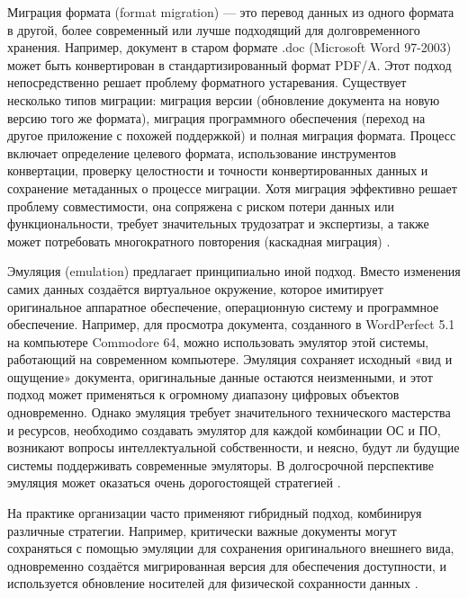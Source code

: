 \documentclass{SibFU-docs}
\begin{document}
Миграция формата (format migration) — это перевод данных из одного формата в другой, более современный или лучше подходящий для долговременного хранения. Например, документ в старом формате .doc (Microsoft Word 97-2003) может быть конвертирован в стандартизированный формат PDF/A. Этот подход непосредственно решает проблему форматного устаревания. Существует несколько типов миграции: миграция версии (обновление документа на новую версию того же формата), миграция программного обеспечения (переход на другое приложение с похожей поддержкой) и полная миграция формата. Процесс включает определение целевого формата, использование инструментов конвертации, проверку целостности и точности конвертированных данных и сохранение метаданных о процессе миграции. Хотя миграция эффективно решает проблему совместимости, она сопряжена с риском потери данных или функциональности, требует значительных трудозатрат и экспертизы, а также может потребовать многократного повторения (каскадная миграция) \cite{SmithsonianInstitution2017PreservationFormats, Cornell2025ArchivingFileFormats}.

Эмуляция (emulation) предлагает принципиально иной подход. Вместо изменения самих данных создаётся виртуальное окружение, которое имитирует оригинальное аппаратное обеспечение, операционную систему и программное обеспечение. Например, для просмотра документа, созданного в WordPerfect 5.1 на компьютере Commodore 64, можно использовать эмулятор этой системы, работающий на современном компьютере. Эмуляция сохраняет исходный «вид и ощущение» документа, оригинальные данные остаются неизменными, и этот подход может применяться к огромному диапазону цифровых объектов одновременно. Однако эмуляция требует значительного технического мастерства и ресурсов, необходимо создавать эмулятор для каждой комбинации ОС и ПО, возникают вопросы интеллектуальной собственности, и неясно, будут ли будущие системы поддерживать современные эмуляторы. В долгосрочной перспективе эмуляция может оказаться очень дорогостоящей стратегией \cite{LIS654DigitalPreservation2015MigrationVsEmulation, DocByte2024PreservationStrategies}.

На практике организации часто применяют гибридный подход, комбинируя различные стратегии. Например, критически важные документы могут сохраняться с помощью эмуляции для сохранения оригинального внешнего вида, одновременно создаётся мигрированная версия для обеспечения доступности, и используется обновление носителей для физической сохранности данных \cite{NationalArchivesUK2025PreservationTools}.
\end{document}
